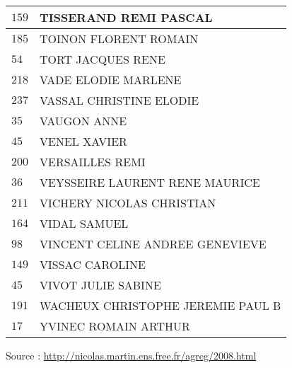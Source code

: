 \begin{xltabular}{\linewidth}{|l|X|}
    \hline
    $159$ & TISSERAND REMI PASCAL \\
    \hline
    $185$ & TOINON FLORENT ROMAIN \\
    \hline
    $54$ & TORT JACQUES RENE \\
    \hline
    $218$ & VADE ELODIE MARLENE \\
    \hline
    $237$ & VASSAL CHRISTINE ELODIE \\
    \hline
    $35$ & VAUGON ANNE \\
    \hline
    $45$ & VENEL XAVIER \\
    \hline
    $200$ & VERSAILLES REMI \\
    \hline
    $36$ & VEYSSEIRE LAURENT RENE MAURICE \\
    \hline
    $211$ & VICHERY NICOLAS CHRISTIAN \\
    \hline
    $164$ & VIDAL SAMUEL \\
    \hline
    $98$ & VINCENT CELINE ANDREE GENEVIEVE \\
    \hline
    $149$ & VISSAC CAROLINE \\
    \hline
    $45$ & VIVOT JULIE SABINE \\
    \hline
    $191$ & WACHEUX CHRISTOPHE JEREMIE PAUL B \\
    \hline
    $17$ & YVINEC ROMAIN ARTHUR \\
    \hline
  \end{xltabular}

  \begin{flushright}
    {\tiny Source : \url{http://nicolas.martin.ens.free.fr/agreg/2008.html}}
  \end{flushright}

